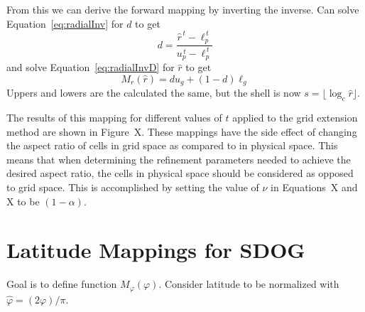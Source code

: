 From this we can derive the forward mapping by inverting the inverse.
Can solve Equation~\ref{eq:radialInv} for $d$ to get
%
\begin{equation} \label{radialForwD}
d = \frac{ \hat{r}^{\,t} - \ell_p^{\,t} }{ u_p^{\,t} - \ell_p^{\,t} }
\end{equation}
%
and solve Equation~\ref{eq:radialInvD} for $\hat{r}$ to get
%
\begin{equation} \label{eq:radialForw}
M_r (\hat{r}) = d u_g + \left( 1 - d \right) \ell_g
\end{equation}
%
Uppers and lowers are the calculated the same, but the shell is now $s = \lfloor \log_{c} \hat{r} \rfloor$.


The results of this mapping for different values of $t$ applied to the grid extension method are shown in Figure~X. These mappings have the side effect of changing the aspect ratio of cells in grid space as compared to in physical space. This means that when determining the refinement parameters needed to achieve the desired aspect ratio, the cells in physical space should be considered as opposed to grid space.
This is accomplished by setting the value of $\nu$ in Equations~X and X to be $(1 - \alpha)$.


\section{Latitude Mappings for SDOG} \label{chap:6:latitude}
Goal is to define function $M_\varphi(\varphi)$. Consider latitude to be normalized with $\hat{\varphi} = (2\varphi) / \pi$.


